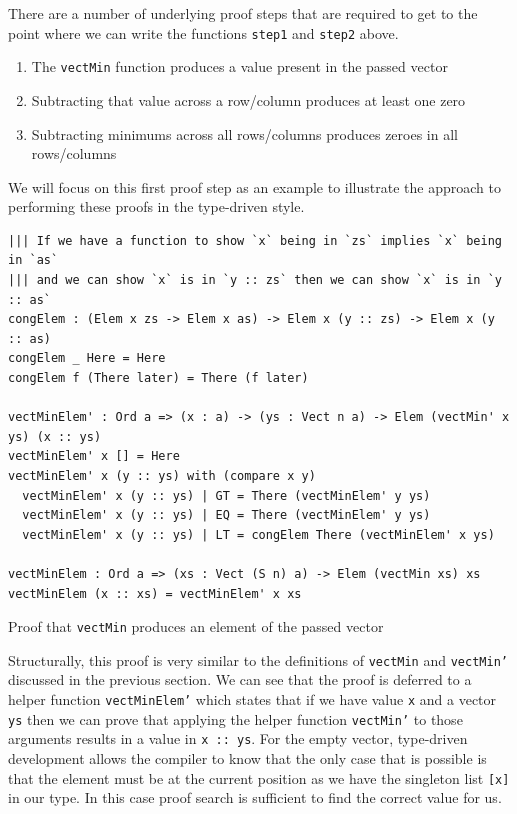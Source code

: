 \documentclass[a4paper, notitlepage]{report}
\begin{document}
There are a number of underlying proof steps that are required to get to the
point where we can write the functions \texttt{step1} and \texttt{step2} above.
\begin{enumerate}
\item The \texttt{vectMin} function produces a value present in the passed vector
\item Subtracting that value across a row/column produces at least one zero
\item Subtracting minimums across all rows/columns produces zeroes in all
rows/columns
\end{enumerate}

We will focus on this first proof step as an example to illustrate the approach
to performing these proofs in the type-driven style.

\begin{listing}[H]
\begin{verbatim}
||| If we have a function to show `x` being in `zs` implies `x` being in `as`
||| and we can show `x` is in `y :: zs` then we can show `x` is in `y :: as`
congElem : (Elem x zs -> Elem x as) -> Elem x (y :: zs) -> Elem x (y :: as)
congElem _ Here = Here
congElem f (There later) = There (f later)

vectMinElem' : Ord a => (x : a) -> (ys : Vect n a) -> Elem (vectMin' x ys) (x :: ys)
vectMinElem' x [] = Here
vectMinElem' x (y :: ys) with (compare x y)
  vectMinElem' x (y :: ys) | GT = There (vectMinElem' y ys)
  vectMinElem' x (y :: ys) | EQ = There (vectMinElem' y ys)
  vectMinElem' x (y :: ys) | LT = congElem There (vectMinElem' x ys)

vectMinElem : Ord a => (xs : Vect (S n) a) -> Elem (vectMin xs) xs
vectMinElem (x :: xs) = vectMinElem' x xs
\end{verbatim}
\caption{Proof that \texttt{vectMin} produces an element of the passed vector}
\end{listing}

Structurally, this proof is very similar to the definitions of \texttt{vectMin} and
\texttt{vectMin'} discussed in the previous section. We can see that the proof is
deferred to a helper function \texttt{vectMinElem'} which states that if we have value \texttt{x}
and a vector \texttt{ys} then we can prove that applying the helper function \texttt{vectMin'} to
those arguments results in a value in \texttt{x :: ys}. For the empty vector, type-driven
development allows the compiler to know that the only case that is possible is
that the element must be at the current position as we have the singleton list
\texttt{[x]} in our type. In this case proof search is sufficient to find the correct
value for us.
\end{document}
